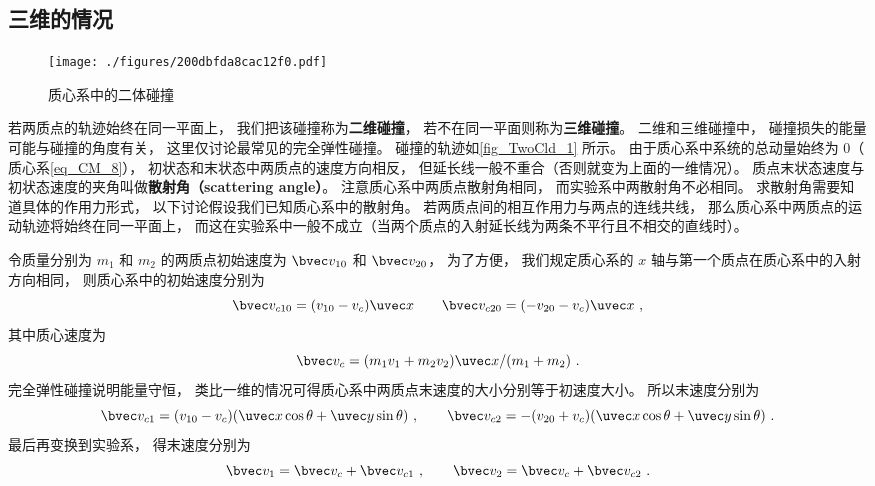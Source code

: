 \subsection{三维的情况}

\begin{figure}[ht]
\centering
\texttt{[image: ./figures/200dbfda8cac12f0.pdf]}
\caption{质心系中的二体碰撞} \label{fig_TwoCld_1}
\end{figure}

若两质点的轨迹始终在同一平面上， 我们把该碰撞称为\textbf{二维碰撞}， 若不在同一平面则称为\textbf{三维碰撞}。 二维和三维碰撞中， 碰撞损失的能量可能与碰撞的角度有关， 这里仅讨论最常见的完全弹性碰撞。
碰撞的轨迹如\autoref{fig_TwoCld_1} 所示。 由于质心系中系统的总动量始终为 0（ 质心系\autoref{eq_CM_8}），  初状态和末状态中两质点的速度方向相反， 但延长线一般不重合（否则就变为上面的一维情况）。 质点末状态速度与初状态速度的夹角叫做\textbf{散射角（scattering angle）}。 注意质心系中两质点散射角相同， 而实验系中两散射角不必相同。 求散射角需要知道具体的作用力形式， 以下讨论假设我们已知质心系中的散射角。%
若两质点间的相互作用力与两点的连线共线， 那么质心系中两质点的运动轨迹将始终在同一平面上， 而这在实验系中一般不成立（当两个质点的入射延长线为两条不平行且不相交的直线时）。

令质量分别为 $m_1$ 和 $m_2$ 的两质点初始速度为 $\bvec v_{10}$ 和 $\bvec v_{20}$， 为了方便， 我们规定质心系的 $x$ 轴与第一个质点在质心系中的入射方向相同， 则质心系中的初始速度分别为
\begin{equation}
\bvec v_{c10} = (v_{10} - v_c)\uvec x \qquad \bvec v_{c20} = (-v_{20} - v_c) \uvec x~,
\end{equation}
其中质心速度为
\begin{equation}
\bvec v_c = (m_1 v_1 + m_2 v_2)\uvec x/(m_1 + m_2)~.
\end{equation}
完全弹性碰撞说明能量守恒， 类比一维的情况可得质心系中两质点末速度的大小分别等于初速度大小。 所以末速度分别为
\begin{equation}
\bvec v_{c1} = (v_{10} - v_c)(\uvec x\cos\theta + \uvec y\sin\theta)~, \qquad
\bvec v_{c2} = -(v_{20} + v_c)(\uvec x\cos\theta + \uvec y\sin\theta)~.
\end{equation}
最后再变换到实验系， 得末速度分别为
\begin{equation}
\bvec v_1 = \bvec v_c + \bvec v_{c1}~, \qquad
\bvec v_2 = \bvec v_c + \bvec v_{c2}~.
\end{equation}

